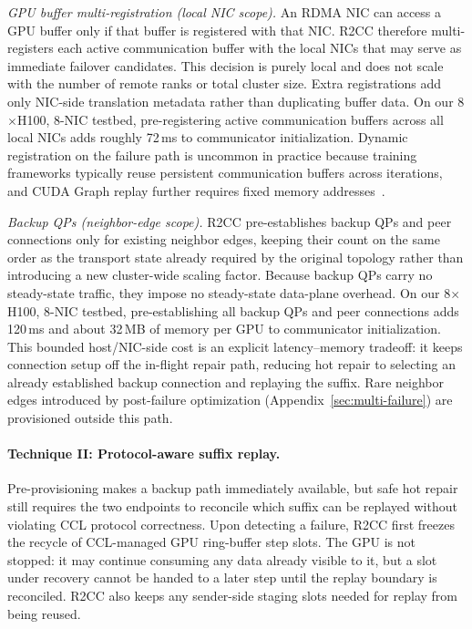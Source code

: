 \documentclass[letterpaper,twocolumn,10pt]{article}
\begin{document}
\textit{GPU buffer multi-registration (local NIC scope).} An RDMA NIC can access a GPU buffer only if that buffer is registered with that NIC. R2CC therefore multi-registers each active communication buffer with the local NICs that may serve as immediate failover candidates. This decision is purely local and does not scale with the number of remote ranks or total cluster size. Extra registrations add only NIC-side translation metadata rather than duplicating buffer data. On our 8$\times$H100, 8-NIC testbed, pre-registering active communication buffers across all local NICs adds roughly 72\,ms to communicator initialization. Dynamic registration on the failure path is uncommon in practice because training frameworks typically reuse persistent communication buffers across iterations, and CUDA Graph replay further requires fixed memory addresses~\cite{cuda-graphs-memory-issues}.

\textit{Backup QPs (neighbor-edge scope).} R2CC pre-establishes backup QPs and peer connections only for existing neighbor edges, keeping their count on the same order as the transport state already required by the original topology rather than introducing a new cluster-wide scaling factor. Because backup QPs carry no steady-state traffic, they impose no steady-state data-plane overhead. On our 8$\times$H100, 8-NIC testbed, pre-establishing all backup QPs and peer connections adds 120\,ms and about 32\,MB of memory per GPU to communicator initialization. This bounded host/NIC-side cost is an explicit latency--memory tradeoff: it keeps connection setup off the in-flight repair path, reducing hot repair to selecting an already established backup connection and replaying the suffix. Rare neighbor edges introduced by post-failure optimization (Appendix~\ref{sec:multi-failure}) are provisioned outside this path.

\paragraph{Technique II: Protocol-aware suffix replay.} Pre-provisioning makes a backup path immediately available, but safe hot repair still requires the two endpoints to reconcile which suffix can be replayed without violating CCL protocol correctness. Upon detecting a failure, R2CC first freezes the recycle of CCL-managed GPU ring-buffer step slots. The GPU is not stopped: it may continue consuming any data already visible to it, but a slot under recovery cannot be handed to a later step until the replay boundary is reconciled. R2CC also keeps any sender-side staging slots needed for replay from being reused.
\end{document}
